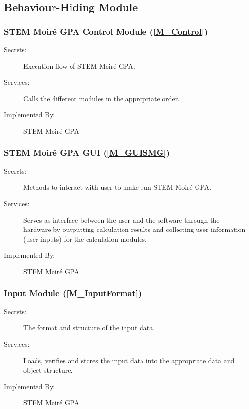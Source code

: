 \documentclass[12pt, titlepage]{article}
\newcommand{\progname}{STEM Moir{\'e} GPA}
\begin{document}
\subsection{Behaviour-Hiding Module}

\subsubsection{\progname{} Control Module (\texorpdfstring{\cref{M_Control}}))}
\label{MG_Control}
\begin{description}
\item[Secrets:] Execution flow of \progname{}.
\item[Services:] Calls the different modules in the appropriate order.
\item[Implemented By:] \progname{}
\end{description}

\subsubsection{\progname{} GUI (\texorpdfstring{\cref{M_GUISMG}}))}
\label{MG_GUISMG}
\begin{description}
\item[Secrets:] Methods to interact with user to make run \progname{}.
\item[Services:] Serves as interface between the user and the software through 
the hardware by outputting calculation results and collecting user information 
(user inputs) for the calculation modules. 
\item[Implemented By:] \progname{}
\end{description}

\subsubsection{Input Module (\texorpdfstring{\cref{M_InputFormat}}))}
\label{MG_InputFormat}
\begin{description}
\item[Secrets:] The format and structure of the input data.
\item[Services:] Loads, verifies and stores the input data into the appropriate 
data and object structure.
\item[Implemented By:] \progname{}
\end{description}
\end{document}
